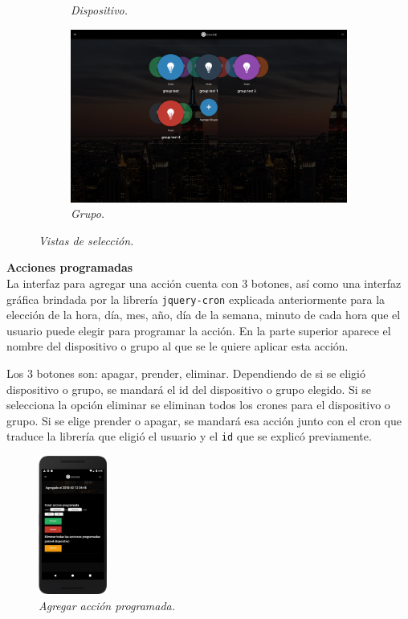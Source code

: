 \begin{figure}[H]
\begin{subfigure}[b]{0.2\textwidth}
    \caption{\textit{Dispositivo.}}
    \label{fig:app-movil-choose-device}
  \end{subfigure}
  \begin{subfigure}[b]{0.6\textwidth}
    \includegraphics[width=\textwidth, keepaspectratio]{images/app-web-choose-group}
    \caption{\textit{Grupo.}}
    \label{fig:app-web-choose-group}
  \end{subfigure}

\caption{\textit{Vistas de selección.}}
\end{figure}

\textbf{Acciones programadas}\\
La interfaz para agregar una acción cuenta con 3 botones, así como una interfaz gráfica brindada por la librería \lstinline[columns=fixed]{jquery-cron} explicada anteriormente para la elección de la hora, día, mes, año, día de la semana, minuto de cada hora que el usuario puede elegir para programar la acción. En la parte superior aparece el nombre del dispositivo o grupo al que se le quiere aplicar esta acción.

Los 3 botones son: apagar, prender, eliminar. Dependiendo de si se eligió dispositivo o grupo, se mandará el id del dispositivo o grupo elegido. Si se selecciona la opción eliminar se eliminan todos los crones para el dispositivo o grupo. Si se elige prender o apagar, se mandará esa acción junto con el cron que traduce la librería que eligió el usuario y el \lstinline[columns=fixed]{id} que se explicó previamente.

\begin{figure}[H]
  \centering
  \includegraphics[width=0.2\textwidth, keepaspectratio]{images/app-movil-scheduler-device}
  \caption{\textit{Agregar acción programada.}}
  \label{fig:app-movil-scheduler-device}
\end{figure}


